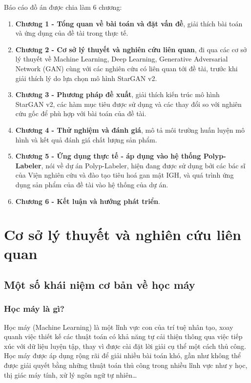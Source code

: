 \documentclass[12pt]{extreport}
\begin{document}
Báo cáo đồ án được chia làm 6 chương:
\begin{enumerate}
    \item \textbf{Chương 1 - Tổng quan về bài toán và đặt vấn đề}, giải thích bài toán và ứng dụng của đề tài trong thực tế.
    \item \textbf{Chương 2 - Cơ sở lý thuyết và nghiên cứu liên quan}, đi qua các cơ sở lý thuyết về Machine Learning, Deep Learning, Generative Adversarial Network (GAN) cùng với các nghiên cứu có liên quan tới đề tài, trước khi giải thích lý do lựa chọn mô hình StarGAN v2.
    \item \textbf{Chương 3 - Phương pháp đề xuất}, giải thích kiến trúc mô hình StarGAN v2, các hàm mục tiêu được sử dụng và các thay đổi so với nghiên cứu gốc để phù hợp với bài toán của đề tài.
    \item \textbf{Chương 4 - Thử nghiệm và đánh giá}, mô tả môi trường huấn luyện mô hình và kết quả đánh giá chất lượng sản phẩm.
    \item \textbf{Chương 5 - Ứng dụng thực tế - áp dụng vào hệ thống Polyp-Labeler}, nói về dự án Polyp-Labeler, hiện đang được sử dụng bởi các bác sĩ của Viện nghiên cứu và đào tạo tiêu hoá gan mật IGH, và quá trình ứng dụng sản phẩm của đề tài vào hệ thống của dự án.
    \item \textbf{Chương 6 - Kết luận và hướng phát triển}.
\end{enumerate}

\chapter{Cơ sở lý thuyết và nghiên cứu liên quan}

\section{Một số khái niệm cơ bản về học máy}

\subsection{Học máy là gì?}

Học máy (Machine Learning) là một lĩnh vực con của trí tuệ nhân tạo, xoay quanh việc thiết kế các thuật toán có khả năng tự cải thiện thông qua việc tiếp xúc với dữ liệu luyện tập, thay vì được cài đặt lời giải cụ thể một cách thủ công. Học máy được áp dụng rộng rãi để giải nhiều bài toán khó, gần như không thể được giải quyết bằng những thuật toán thủ công trong nhiều lĩnh vực như y học, thị giác máy tính, xử lý ngôn ngữ tự nhiên\dots
\end{document}
